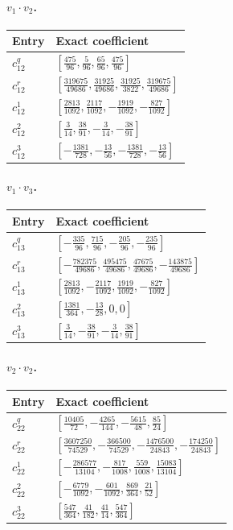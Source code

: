 \paragraph{$v_1\cdot v_2$.}
\begin{longtable}{@{}ll@{}}
\toprule
Entry&Exact coefficient\\
\midrule\endhead
$c^{q}_{12}$&$[\frac{475}{96},\frac{5}{96},\frac{65}{96},\frac{475}{96}]$\\[3pt]
$c^{r}_{12}$&$[\frac{319675}{49686},\frac{31925}{49686},\frac{31925}{3822},\frac{319675}{49686}]$\\[3pt]
$c^{1}_{12}$&$[\frac{2813}{1092},\frac{2117}{1092},-\frac{1919}{1092},-\frac{827}{1092}]$\\[3pt]
$c^{2}_{12}$&$[\frac{3}{14},\frac{38}{91},-\frac{3}{14},-\frac{38}{91}]$\\[3pt]
$c^{3}_{12}$&$[-\frac{1381}{728},-\frac{13}{56},-\frac{1381}{728},-\frac{13}{56}]$\\[3pt]
\bottomrule
\end{longtable}
\paragraph{$v_1\cdot v_3$.}
\begin{longtable}{@{}ll@{}}
\toprule
Entry&Exact coefficient\\
\midrule\endhead
$c^{q}_{13}$&$[-\frac{335}{96},\frac{715}{96},-\frac{205}{96},-\frac{235}{96}]$\\[3pt]
$c^{r}_{13}$&$[-\frac{782375}{49686},\frac{495475}{49686},\frac{47675}{49686},-\frac{143875}{49686}]$\\[3pt]
$c^{1}_{13}$&$[\frac{2813}{1092},-\frac{2117}{1092},\frac{1919}{1092},-\frac{827}{1092}]$\\[3pt]
$c^{2}_{13}$&$[\frac{1381}{364},-\frac{13}{28},0,0]$\\[3pt]
$c^{3}_{13}$&$[\frac{3}{14},-\frac{38}{91},-\frac{3}{14},\frac{38}{91}]$\\[3pt]
\bottomrule
\end{longtable}
\paragraph{$v_2\cdot v_2$.}
\begin{longtable}{@{}ll@{}}
\toprule
Entry&Exact coefficient\\
\midrule\endhead
$c^{q}_{22}$&$[\frac{10405}{72},-\frac{4265}{144},-\frac{5615}{48},\frac{85}{24}]$\\[3pt]
$c^{r}_{22}$&$[\frac{3607250}{74529},-\frac{366500}{74529},-\frac{1476500}{24843},-\frac{174250}{24843}]$\\[3pt]
$c^{1}_{22}$&$[-\frac{286577}{13104},-\frac{817}{1008},\frac{559}{1008},\frac{15083}{13104}]$\\[3pt]
$c^{2}_{22}$&$[-\frac{6779}{1092},-\frac{601}{1092},\frac{869}{364},\frac{21}{52}]$\\[3pt]
$c^{3}_{22}$&$[\frac{547}{364},\frac{41}{182},\frac{41}{14},\frac{547}{364}]$\\[3pt]
\bottomrule
\end{longtable}
